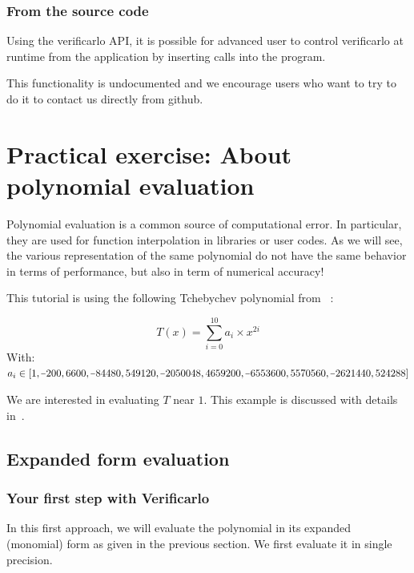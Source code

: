 \documentclass{TP}
\newcommand*{\matminus}{%
  \leavevmode
  \hphantom{0}%
  \llap{%
    \settowidth{\dimen0 }{$0$}%
    \resizebox{1.1\dimen0 }{\height}{$-$}%
  }%
}
\begin{document}
\subsubsection{From the source code}

Using the verificarlo API, it is possible for advanced user to control verificarlo at runtime from the application by inserting calls into the program.

This functionality is undocumented and we encourage users who want to try to do it to contact us directly from github.




\section{Practical exercise: About polynomial evaluation}

Polynomial evaluation is a common source of computational error. In particular, they are used for function interpolation in libraries or user codes. As we will see, the various representation of the same polynomial do not have the same behavior in terms of performance, but also in term of numerical accuracy!

This tutorial is using the following Tchebychev polynomial from ~\cite[pp.52-54]{parker1997monte}:

$$T(x)=\sum_{i=0}^{10}{a_i \times x^{2i}}$$
With:
$a_i \in [
  1,
  \matminus 200,
  6600,
  \matminus 84480,
  549120,
  \matminus 2050048,
  4659200,
  \matminus 6553600,
  5570560,
  \matminus 2621440,
  524288
]$

We are interested in evaluating  $T$ near $1$.
This example is discussed with details in~\cite[pp.52-54]{parker1997monte}.

\subsection{Expanded form evaluation}

\subsubsection{Your first step with Verificarlo}

In this first approach, we will evaluate the polynomial in its expanded (monomial) form as given in the previous section. %
We first evaluate it in single precision.
\end{document}
